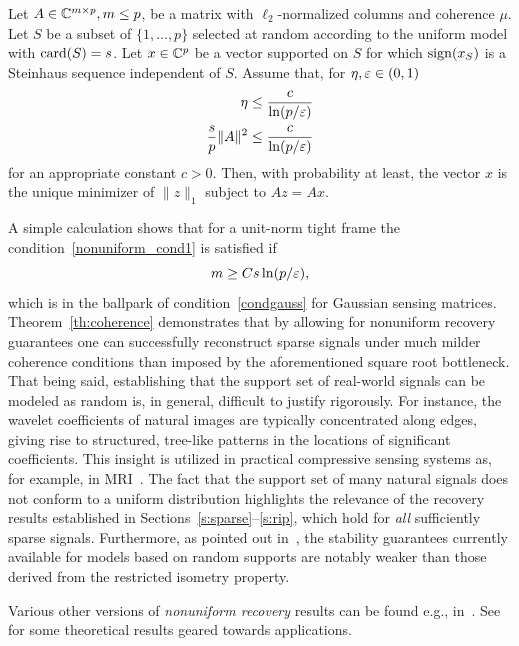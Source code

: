 \begin{theorem}\label{th:coherence}
Let $A \in \mathbb{C}^{m \times p}, m \le p$, be a matrix with $\ell_2$-normalized columns and coherence $\mu$. Let $S$ be a subset of $\{1,\dots,p\}$ selected at random according to the uniform model with $\operatorname{card}(S) = s$. Let $x \in \mathbb{C}^p$ be a vector supported on $S$ for which $\operatorname{sign}(x_S)$
is a Steinhaus sequence independent of $S$. Assume that, for $\eta,\varepsilon \in (0,1)$
\begin{align}
  \eta & \le  \frac{c}{\ln(p/\varepsilon)} \label{nonuniform_cond1}  \\
  \frac{s}{p} \|A\|^2 & \le  \frac{c}{\ln(p/\varepsilon)}  \label{nonuniform_cond2}
\end{align}
for an appropriate constant $c > 0$. Then, with probability at least, the
vector $x$ is the unique minimizer of $\|z\|_1$  subject to  $Az = Ax$.
\end{theorem}

A simple calculation shows that for a unit-norm tight frame the
condition~\ref{nonuniform_cond1} is satisfied if $$m \ge Cs \ln(p/\varepsilon),$$
which is in the ballpark of condition~\eqref{condgauss} for Gaussian sensing matrices.
Theorem~\ref{th:coherence} demonstrates that by allowing for nonuniform recovery guarantees one can successfully reconstruct sparse signals under
much milder coherence conditions than imposed by the aforementioned square root bottleneck. That being said, establishing that the support set of real-world signals can be modeled as random is, in general, difficult to justify rigorously. For instance, the wavelet coefficients of natural images are typically concentrated along edges, giving rise to structured, tree-like patterns in the locations of significant coefficients. This insight is utilized in practical compressive sensing systems as, for example, in MRI~\cite{lustig2007sparse,Adcock-Hansen-book}.
The fact that the support set of many natural signals does not conform to a uniform distribution highlights the relevance of the recovery results established in Sections~\ref{s:sparse}--\ref{s:rip}, which hold for {\em all} sufficiently sparse signals.
 Furthermore, as pointed out in~\cite{FoucartRauhut_CSbook}, the stability guarantees currently available for models based on random supports are notably weaker than those derived from the restricted isometry property.

Various other versions of {\em nonuniform recovery} results can be found e.g., in~\cite{Tropp_Dictionaries,CP08,FoucartRauhut_CSbook}. See~\cite{strohmer2014analysis,hugel2014remote,Adcock-Hansen-book} for some theoretical results geared towards applications. 


